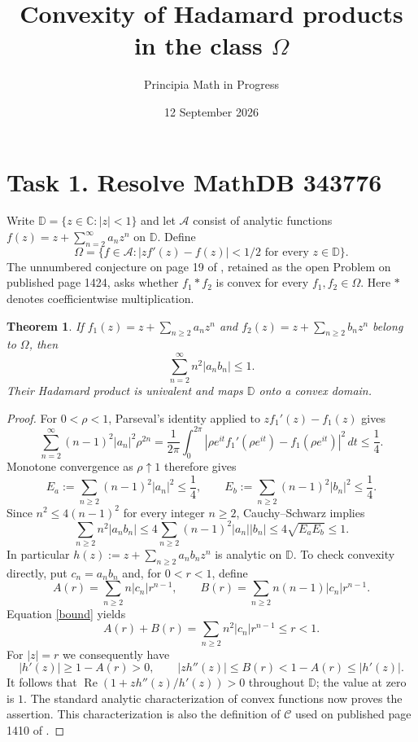 \documentclass[11pt]{article}
\title{Convexity of Hadamard products in the class $\Omega$}
\author{Principia Math in Progress}
\date{12 September 2026}
\newtheorem{theorem}{Theorem}
\newcommand{\D}{\mathbb D}
\begin{document}
\maketitle
\section*{Task 1. Resolve MathDB 343776}
Write $\D=\{z\in\mathbb C:|z|<1\}$ and let $\mathcal A$ consist of analytic
functions $f(z)=z+\sum_{n=2}^{\infty}a_nz^n$ on $\D$. Define
\[
 \Omega=\{f\in\mathcal A:|zf'(z)-f(z)|<1/2\text{ for every }z\in\D\}.
\]
The unnumbered conjecture on page 19 of \cite{WS}, retained as the open
Problem on published page 1424, asks whether $f_1*f_2$ is convex for every
$f_1,f_2\in\Omega$. Here $*$ denotes coefficientwise multiplication.

\begin{theorem}
If $f_1(z)=z+\sum_{n\ge2}a_nz^n$ and
$f_2(z)=z+\sum_{n\ge2}b_nz^n$ belong to $\Omega$, then
\begin{equation}\label{bound}
 \sum_{n=2}^{\infty}n^2|a_nb_n|\le1.
\end{equation}
Their Hadamard product is univalent and maps $\D$ onto a convex domain.
\end{theorem}
\begin{proof}
For $0<\rho<1$, Parseval's identity applied to $zf_1'(z)-f_1(z)$ gives
\[
 \sum_{n=2}^{\infty}(n-1)^2|a_n|^2\rho^{2n}
 =\frac1{2\pi}\int_0^{2\pi}
   |\rho e^{it}f_1'(\rho e^{it})-f_1(\rho e^{it})|^2\,dt
 \le\frac14.
\]
Monotone convergence as $\rho\uparrow1$ therefore gives
\[
 E_a:=\sum_{n\ge2}(n-1)^2|a_n|^2\le\frac14,
 \qquad E_b:=\sum_{n\ge2}(n-1)^2|b_n|^2\le\frac14.
\]
Since $n^2\le4(n-1)^2$ for every integer $n\ge2$, Cauchy--Schwarz implies
\[
 \sum_{n\ge2}n^2|a_nb_n|
 \le4\sum_{n\ge2}(n-1)^2|a_n||b_n|
 \le4\sqrt{E_aE_b}\le1.
\]
In particular $h(z):=z+\sum_{n\ge2}a_nb_nz^n$ is analytic on $\D$.
To check convexity directly, put $c_n=a_nb_n$ and, for $0<r<1$, define
\[
 A(r)=\sum_{n\ge2}n|c_n|r^{n-1},\qquad
 B(r)=\sum_{n\ge2}n(n-1)|c_n|r^{n-1}.
\]
Equation \eqref{bound} yields
\[
 A(r)+B(r)=\sum_{n\ge2}n^2|c_n|r^{n-1}\le r<1.
\]
For $|z|=r$ we consequently have
\[
 |h'(z)|\ge1-A(r)>0,\qquad
 |zh''(z)|\le B(r)<1-A(r)\le|h'(z)|.
\]
It follows that $\operatorname{Re}(1+zh''(z)/h'(z))>0$ throughout $\D$;
the value at zero is $1$. The standard analytic characterization of convex
functions now proves the assertion. This characterization is also the
definition of $\mathcal C$ used on published page 1410 of \cite{WS}.
\end{proof}
\end{document}
